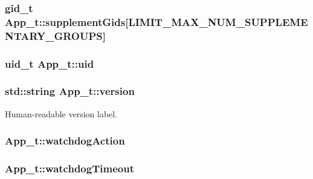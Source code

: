 \subsubsection[{\texorpdfstring{supplement\+Gids}{supplementGids}}]{\setlength{\rightskip}{0pt plus 5cm}gid\+\_\+t App\+\_\+t\+::supplement\+Gids\mbox{[}{\bf L\+I\+M\+I\+T\+\_\+\+M\+A\+X\+\_\+\+N\+U\+M\+\_\+\+S\+U\+P\+P\+L\+E\+M\+E\+N\+T\+A\+R\+Y\+\_\+\+G\+R\+O\+U\+PS}\mbox{]}}\hypertarget{struct_app__t_a32f5ecf9d792779a2ea70be0b418cb81}{}\label{struct_app__t_a32f5ecf9d792779a2ea70be0b418cb81}
\subsubsection[{\texorpdfstring{uid}{uid}}]{\setlength{\rightskip}{0pt plus 5cm}uid\+\_\+t App\+\_\+t\+::uid}\hypertarget{struct_app__t_a916ba7e8111d3f5baa12506394046dbd}{}\label{struct_app__t_a916ba7e8111d3f5baa12506394046dbd}
\subsubsection[{\texorpdfstring{version}{version}}]{\setlength{\rightskip}{0pt plus 5cm}std\+::string App\+\_\+t\+::version}\hypertarget{struct_app__t_a1e9aa46ab4240a803633ad607cdf62ff}{}\label{struct_app__t_a1e9aa46ab4240a803633ad607cdf62ff}


Human-\/readable version label. 

\subsubsection[{\texorpdfstring{watchdog\+Action}{watchdogAction}}]{ App\+\_\+t\+::watchdog\+Action}\hypertarget{struct_app__t_a9c69931eaf806dddb9878e8cbc8c3e37}{}\label{struct_app__t_a9c69931eaf806dddb9878e8cbc8c3e37}
\subsubsection[{\texorpdfstring{watchdog\+Timeout}{watchdogTimeout}}]{ App\+\_\+t\+::watchdog\+Timeout}\hypertarget{struct_app__t_a3b6e1b614e852120774e67fbc4a13197}{}\label{struct_app__t_a3b6e1b614e852120774e67fbc4a13197}
